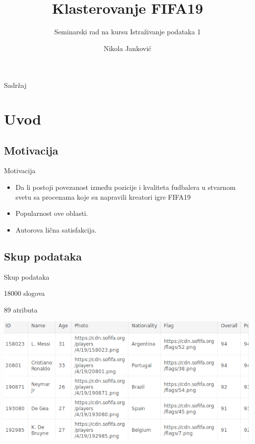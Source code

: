 \documentclass[12pt]{beamer}
\author{Nikola Janković}
\title{Klasterovanje FIFA19}
\subtitle{Seminarski rad na kursu Istraživanje podataka 1}
\institute{Matematički fakultet, Univerzitet u Beogradu}
\begin{document}
\begin{frame}
\titlepage
\end{frame}

\section[Sadržaj]{}
\begin{frame}{Sadržaj}
\tableofcontents
\end{frame}

\section{Uvod}
\subsection{Motivacija}
\begin{frame}{Motivacija}
\begin{itemize}
\item Da li postoji povezanost između 
pozicije i kvaliteta fudbalera u stvarnom svetu
sa procenama koje su napravili kreatori igre
FIFA19 \pause
\item Popularnost ove oblasti. \pause
\item Autorova lična satisfakcija.
\end{itemize}
\end{frame}



\subsection{Skup podataka}
\begin{frame}{Skup podataka}
\begin{itemize}
 {
\item 18000 slogova 
\item 89 atributa
}
\end{itemize} 
 {\includegraphics[scale=0.4]{../head}
}

\end{frame}
\end{document}
